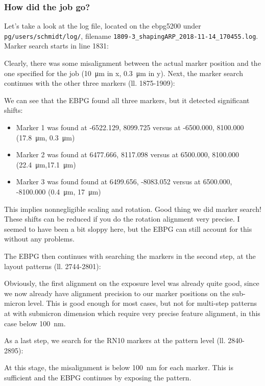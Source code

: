 \subsubsection{How did the job go?}
Let's take a look at the log file, located on the ebpg5200 under \texttt{pg/users/schmidt/log/}, filename \texttt{1809-3\_shapingARP\_2018-11-14\_170455.log}.
%
Marker search starts in line 1831:
%

%
Clearly, there was some misalignment between the actual marker position and the one specified for the job (\SI{10}{\micro\meter} in x, \SI{0.3}{\micro\meter} in y).
%
Next, the marker search continues with the other three markers (ll. 1875-1909):
%

%
We can see that the EBPG found all three markers, but it detected significant shifts:
\begin{itemize}
	\item Marker 1 was found at -6522.129, 8099.725 versus at -6500.000, 8100.000 (\SI{17.8}{\micro\meter}, \SI{0.3}{\micro\meter})
	\item Marker 2 was found at 6477.666, 8117.098 versus at 6500.000, 8100.000 (\SI{22.4}{\micro\meter},\SI{17.1}{\micro\meter})
	\item Marker 3 was found found at 6499.656, -8083.052 versus at 6500.000, -8100.000 (\SI{0.4}{\micro\meter}, \SI{17}{\micro\meter})
\end{itemize}
This implies nonnegligible scaling and rotation.
%
Good thing we did marker search! 
%
These shifts can be reduced if you do the rotation alignment very precise. 
%
I seemed to have been a bit sloppy here, but the EBPG can still account for this without any problems.

The EBPG then continues with searching the markers in the second step, at the layout patterns (ll. 2744-2801):
%

%
Obviously, the first alignment on the exposure level was already quite good, since we now already have alignment precision to our marker positions on the sub-micron level. 
%
This is good enough for most cases, but not for multi-step patterns at with submicron dimension which require very precise feature alignment, in this case below \SI{100}{\nano\meter}.

As a last step, we search for the RN10 markers at the pattern level (ll. 2840-2895):
%

%
At this stage, the misalignment is below \SI{100}{\nano\meter} for each marker. 
%
This is sufficient and the EBPG continues by exposing the pattern.


\clearpage
{}

